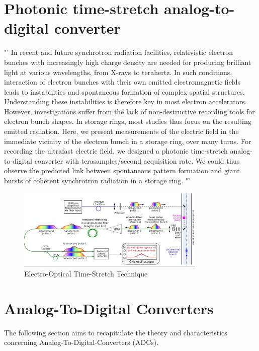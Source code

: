 \newpage 
\section{Photonic time-stretch analog-to-digital converter}










"' In recent and future synchrotron radiation facilities, relativistic electron bunches with increasingly high charge density are needed for producing brilliant light at various wavelengths, from X-rays to terahertz. In such conditions, interaction of electron bunches with their own emitted electromagnetic fields leads to instabilities and spontaneous formation of complex spatial structures. Understanding these instabilities is therefore key in most electron accelerators. However, investigations suffer from the lack of non-destructive recording tools for electron bunch shapes. In storage rings, most studies thus focus on the resulting emitted radiation. Here, we present measurements of the electric field in the immediate vicinity of the electron bunch in a storage ring, over many turns. For recording the ultrafast electric field, we designed a photonic time-stretch analog-to-digital converter with terasamples/second acquisition rate. We could thus observe the predicted link between spontaneous pattern formation and giant bursts of coherent synchrotron radiation in a storage ring. "'  \cite{Bielawski2019}

\begin{figure}[H]
	\centering
	\includegraphics[width = 0.8\textwidth]{chap/02-theory/img/EO.png}
	\caption{Electro-Optical Time-Stretch Technique \cite{Bielawski2019}}
	\label{fig:eo}
\end{figure}


\newpage


\section{Analog-To-Digital Converters}
The following section aims to recapitulate the theory and characteristics concerning Analog-To-Digital-Converters (ADCs).
